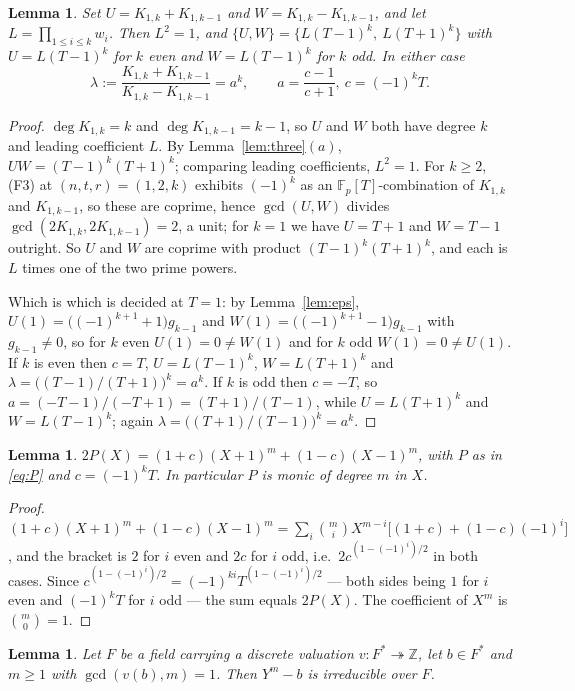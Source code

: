 \documentclass[11pt]{amsart}
\newtheorem{lemma}[theorem]{Lemma}
\theoremstyle{remark}
\newcommand{\Fp}{\mathbb F_p}
\newcommand{\Kc}[2]{K_{#1,#2}}
\begin{document}
\begin{lemma}\label{lem:lambda}
Set $U=\Kc1k+\Kc1{k-1}$ and $W=\Kc1k-\Kc1{k-1}$, and let $L=\prod_{1\le i\le k}w_i$. Then $L^2=1$,
and $\{U,W\}=\{L(T-1)^k,\ L(T+1)^k\}$ with $U=L(T-1)^k$ for $k$ even and $W=L(T-1)^k$ for $k$ odd.
In either case
\[
 \lambda:=\frac{\Kc1k+\Kc1{k-1}}{\Kc1k-\Kc1{k-1}}=a^k,
 \qquad a=\frac{c-1}{c+1},\ c=(-1)^kT.
\]
\end{lemma}

\begin{proof}
$\deg\Kc1k=k$ and $\deg\Kc1{k-1}=k-1$, so $U$ and $W$ both have degree $k$ and leading coefficient
$L$. By Lemma~\ref{lem:three}$(a)$, $UW=(T-1)^k(T+1)^k$; comparing leading coefficients, $L^2=1$.
For $k\ge2$, (F3) at $(n,t,r)=(1,2,k)$ exhibits $(-1)^k$ as an $\Fp[T]$-combination of $\Kc1k$ and
$\Kc1{k-1}$, so these are coprime, hence $\gcd(U,W)$ divides $\gcd(2\Kc1k,2\Kc1{k-1})=2$, a unit;
for $k=1$ we have $U=T+1$ and $W=T-1$ outright. So $U$ and $W$ are coprime with product
$(T-1)^k(T+1)^k$, and each is $L$ times one of the two prime powers.

Which is which is decided at $T=1$: by Lemma~\ref{lem:eps},
$U(1)=\bigl((-1)^{k+1}+1\bigr)g_{k-1}$ and $W(1)=\bigl((-1)^{k+1}-1\bigr)g_{k-1}$ with
$g_{k-1}\ne0$, so for $k$ even $U(1)=0\ne W(1)$ and for $k$ odd $W(1)=0\ne U(1)$. If $k$ is even
then $c=T$, $U=L(T-1)^k$, $W=L(T+1)^k$ and $\lambda=\bigl((T-1)/(T+1)\bigr)^k=a^k$. If $k$ is odd
then $c=-T$, so $a=(-T-1)/(-T+1)=(T+1)/(T-1)$, while $U=L(T+1)^k$ and $W=L(T-1)^k$; again
$\lambda=\bigl((T+1)/(T-1)\bigr)^k=a^k$.
\end{proof}

\begin{lemma}\label{lem:split}
$2P(X)=(1+c)(X+1)^m+(1-c)(X-1)^m$, with $P$ as in \eqref{eq:P} and $c=(-1)^kT$. In particular $P$
is monic of degree $m$ in $X$.
\end{lemma}

\begin{proof}
$(1+c)(X+1)^m+(1-c)(X-1)^m
=\sum_i\binom mi X^{m-i}\bigl[(1+c)+(1-c)(-1)^i\bigr]$, and the bracket is $2$ for $i$ even and
$2c$ for $i$ odd, i.e.\ $2c^{(1-(-1)^i)/2}$ in both cases. Since $c^{(1-(-1)^i)/2}
=(-1)^{ki}T^{(1-(-1)^i)/2}$ --- both sides being $1$ for $i$ even and $(-1)^kT$ for $i$ odd --- the
sum equals $2P(X)$. The coefficient of $X^m$ is $\binom m0=1$.
\end{proof}

\begin{lemma}\label{lem:capelli}
Let $F$ be a field carrying a discrete valuation $v\colon F^*\twoheadrightarrow\mathbb Z$, let
$b\in F^*$ and $m\ge1$ with $\gcd(v(b),m)=1$. Then $Y^m-b$ is irreducible over $F$.
\end{lemma}
\end{document}
